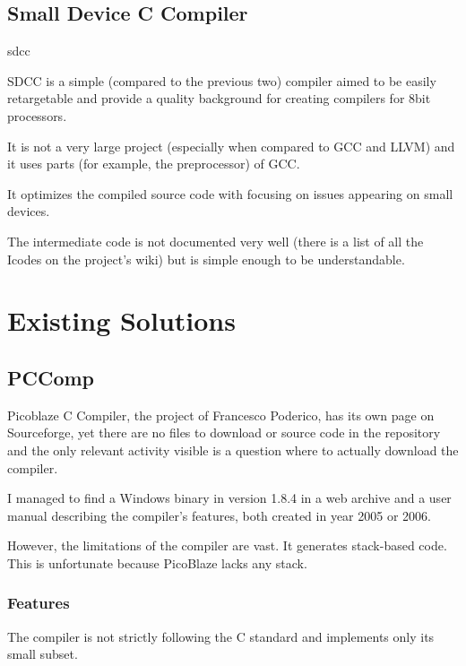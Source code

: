     \section{Small Device C Compiler}{sdcc}

    SDCC is a simple (compared to the previous two) compiler aimed to be easily retargetable and provide a quality background for creating compilers for 8bit processors.

    It is not a very large project (especially when compared to GCC and LLVM) and it uses parts (for example, the preprocessor) of GCC.

    It optimizes the compiled source code with focusing on issues appearing on small devices.

    The intermediate code is not documented very well (there is a list of all the Icodes on the project's wiki) but is simple enough to be understandable.


\chapter{Existing Solutions}\label{existing}

    \section{PCComp}\label{pccomp}

    Picoblaze C Compiler, the project of Francesco Poderico, has its own page on Sourceforge, 
    yet there are no files to download or source code in the repository and the only relevant activity visible is a question where to actually download the compiler.

    I managed to find a Windows binary in version 1.8.4 in a web archive and a user manual describing the compiler's features, both created in year 2005 or 2006.

    However, the limitations of the compiler are vast. It generates stack-based code. This is unfortunate because PicoBlaze lacks any stack. 

        \subsection{Features}

        The compiler is not strictly following the C standard and implements only its small subset.

